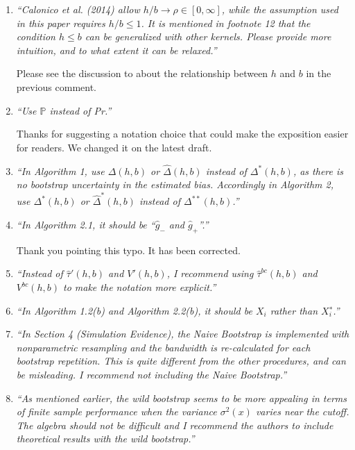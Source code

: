 \documentclass[12pt,fleqn]{article}
\begin{document}
\begin{enumerate}
\item \textit{``Calonico et al. (2014) allow $h/b \rightarrow \rho \in [0,\infty]$, while the assumption used in this paper requires $h/b \leq 1$. It is mentioned in footnote 12 that the condition $h \leq b$ can be generalized with other kernels. Please provide more intuition, and to what extent it can be relaxed.''}

Please see the discussion to about the relationship between $h$ and $b$ in the previous comment.

\item \textit{``Use $\mathbb{P}$ instead of Pr.''}

Thanks for suggesting a notation choice that could make the exposition easier for readers. We changed it on the latest draft.

\item \textit{``In Algorithm 1, use $\Delta(h,b)$ or $\hat{\Delta}(h,b)$ instead of $\Delta^{*}(h,b)$, as there is no bootstrap uncertainty in the estimated bias. Accordingly in Algorithm 2, use $\Delta^{*}(h,b)$ or $\hat{\Delta}^{*}(h,b)$ instead of $\Delta^{**}(h,b)$.''}


\item \textit{``In Algorithm 2.1, it should be ``$\hat{g}_{−}$ and $\hat{g}_{+}$''.''}
 
 Thank you pointing this typo. It has been corrected.

\item \textit{``Instead of $\hat{\tau}'(h,b)$ and $V'(h,b)$, I recommend using $\hat{\tau}^{bc}(h,b)$ and $V^{bc}(h,b)$ to make the notation more explicit.''}


\item \textit{``In Algorithm 1.2(b) and Algorithm 2.2(b), it should be $X_{i}$ rather than $X^{∗}_{i}$.''}
 

\item \textit{``In Section 4 (Simulation Evidence), the Naive Bootstrap is implemented with nonparametric resampling and the bandwidth is re-calculated for each bootstrap repetition.
This is quite different from the other procedures, and can be misleading. I recommend not including the Naive Bootstrap.''}

\item \textit{``As mentioned earlier, the wild bootstrap seems to be more appealing in terms of finite sample performance when the variance $\sigma^{2}(x)$ varies near the cutoff. The algebra should not be difficult and I recommend the authors to include theoretical results with the wild bootstrap.''}


\end{enumerate}
\end{document}
